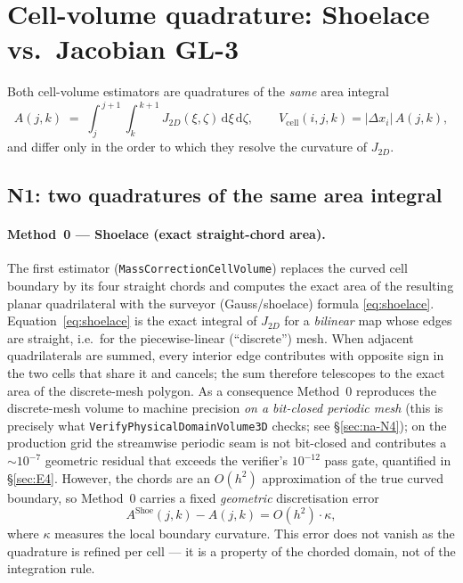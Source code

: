 \documentclass[11pt]{article}
\theoremstyle{definition}
\theoremstyle{remark}
\begin{document}
\section{Cell-volume quadrature: Shoelace vs.\ Jacobian GL-3}
\label{sec:quadrature}

Both cell-volume estimators are quadratures of the \emph{same} area integral
\begin{equation}
  A(j,k) \;=\; \int_{j}^{\,j+1}\!\!\int_{k}^{\,k+1}
  J_{2D}(\xi,\zeta)\,\mathrm{d}\xi\,\mathrm{d}\zeta ,
  \qquad
  V_{\mathrm{cell}}(i,j,k)=\lvert\Delta x_i\rvert\,A(j,k),
  \label{eq:na-Adef}
\end{equation}
and differ only in the order to which they resolve the curvature of $J_{2D}$.

\subsection{N1: two quadratures of the same area integral}
\label{sec:na-N1}

\paragraph{Method~0 --- Shoelace (exact straight-chord area).}
The first estimator (\texttt{MassCorrectionCellVolume}) replaces the curved cell
boundary by its four straight chords and computes the exact area of the resulting
planar quadrilateral with the surveyor (Gauss/shoelace) formula \eqref{eq:shoelace}.
Equation~\eqref{eq:shoelace} is the exact integral of $J_{2D}$ for a \emph{bilinear}
map whose edges are straight, i.e.\ for the piecewise-linear (``discrete'') mesh.
When adjacent quadrilaterals are summed, every interior edge contributes with
opposite sign in the two cells that share it and cancels; the sum therefore
telescopes to the exact area of the discrete-mesh polygon. As a consequence
Method~0 reproduces the discrete-mesh volume to machine precision \emph{on a
bit-closed periodic mesh} (this is precisely what
\texttt{VerifyPhysicalDomainVolume3D} checks; see \S\ref{sec:na-N4}); on the
production grid the streamwise periodic seam is not bit-closed and contributes a
$\sim\!10^{-7}$ geometric residual that exceeds the verifier's $10^{-12}$ pass
gate, quantified in \S\ref{sec:E4}. However, the chords are an $O(h^2)$ approximation of the true
curved boundary, so Method~0 carries a fixed \emph{geometric} discretisation error
\begin{equation}
  A^{\mathrm{Shoe}}(j,k) - A(j,k) = O(h^2)\cdot \kappa ,
  \label{eq:na-shoe-error}
\end{equation}
where $\kappa$ measures the local boundary curvature. This error does not vanish
as the quadrature is refined per cell --- it is a property of the chorded domain,
not of the integration rule.
\end{document}
